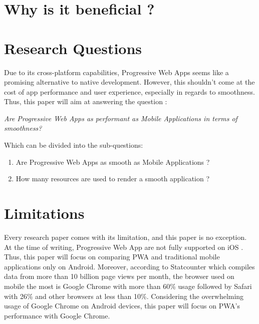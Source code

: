 \documentclass{kththesis}
\begin{document}
\section{Why is it beneficial ?}


\section{Research Questions}

Due to its cross-platform capabilities, Progressive Web Apps seems like a promising alternative to native development. However, this shouldn't come at the cost of app performance and user experience, especially in regards to smoothness.
Thus, this paper will aim at answering the question : 
\begin{center}
    \textit{Are Progressive Web Apps as performant as Mobile Applications in terms of smoothness?}
\end{center}
Which can be divided into the sub-questions: 
\begin{enumerate}
    \item Are Progressive Web Apps as smooth as Mobile Applications ?
    \item How many resources are used to render a smooth application ?
\end{enumerate}

\section{Limitations}

Every research paper comes with its limitation, and this paper is no exception. 
At the time of writing, Progressive Web App are not fully supported on iOS \cite{BackgroundSync_support} \cite{Manifest_support}. Thus, this paper will focus on comparing PWA and traditional mobile applications only on Android. 
Moreover, according to Statcounter \cite{Browser_data} which compiles data from more than 10 billion page views per month, the browser used on mobile the most is Google Chrome with more than 60\% usage followed by Safari with 26\% and other browsers at less than 10\%. 
Considering the overwhelming usage of Google Chrome on Android devices, this paper will focus on PWA's performance with Google Chrome. 
\end{document}
